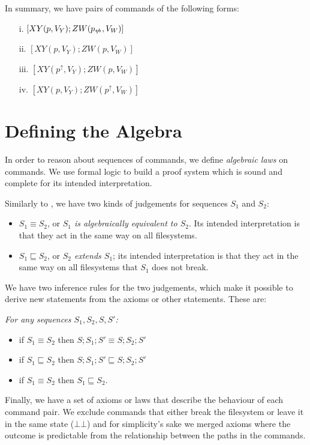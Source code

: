\documentclass[12pt]{article}
\newcommand{\empt}{\bot}
\newcommand{\pp}{p^\uparrow} %
\newcommand{\np}{p_{\centernot\leftrightarrow}} %
\newcommand{\fscommand}[2]{{#1#2}}
\newcommand{\fsregcommandchar}[1]{\mathtt{#1}}
\newcommand{\fsregcommand}[2]{\fscommand{\fsregcommandchar{#1}}{\fsregcommandchar{#2}}}
\newcommand{\cbb}{\fsregcommand{\empt}{\empt}}
\newcommand{\cxy}{\fscommand{X}{Y}}
\newcommand{\czw}{\fscommand{Z}{W}}
\newcommand{\eqext}{\sqsubseteq}
\begin{document}
In summary, we have pairs of commands
of the following forms:
\begin{itemize}
\item[i.] \( [\cxy(p,V_Y); \czw(\np,V_W)] \)
\item[ii.] \( [\cxy(p,V_Y); \czw(p,V_W)] \)
\item[iii.] \( [\cxy(\pp,V_Y); \czw(p,V_W)] \)
\item[iv.] \( [\cxy(p,V_Y); \czw(\pp,V_W)] \)
\end{itemize}


\section{Defining the Algebra}

In order to reason about sequences of commands, we define \emph{algebraic laws} on
commands. We use formal logic to build a proof system which is sound and
complete for its intended interpretation.

Similarly to \cite{NREC:alg}, we have two kinds of judgements
for sequences \(S_1\) and \(S_2\):
\begin{itemize}
\item \(S_1\equiv S_2\), or \emph{\(S_1\) is algebraically equivalent to
\(S_2\)}. Its intended interpretation is that they act in the same way on all
filesystems.
\item \(S_1\eqext S_2\), or \emph{\(S_2\) extends \(S_1\)}; its intended
interpretation is that they act in the same way on all
filesystems that \(S_1\) does not break.
\end{itemize}

We have two inference rules for the two judgements,
which make it possible to derive new statements from the axioms or other statements.
These are:

\emph{For any sequences \(S_1, S_2, S, S'\):}
\begin{itemize}
\item if \(S_1\equiv S_2\) then \(S;S_1;S'\equiv S;S_2;S'\)
\item if \(S_1\eqext S_2\) then \(S;S_1;S'\eqext S;S_2;S'\)
\item if \(S_1\equiv S_2\) then \(S_1\eqext S_2\).
\end{itemize}

Finally, we have a set of axioms or laws that describe the behaviour
of each command pair. We exclude commands that either break the
filesystem or leave it in the same state ($\cbb$) and for
simplicity's sake we merged axioms where the outcome is predictable
from the relationship between the paths in the commands.
\end{document}
